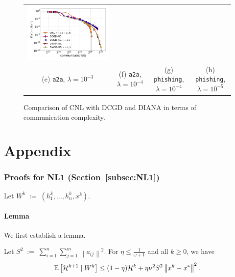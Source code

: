 \documentclass[10pt]{article}
\newcommand{\eqdef}{\; { := }\;}
\newcommand{\ExpBr}[1]{\mathbb{E}\left[#1\right]}
\newcommand{\norm}[1]{\left\|#1\right\|}
\begin{document}
\begin{figure}[ht]
\begin{center}
{\begin{tabular}{cccc}
				\includegraphics[width = 0.23 \textwidth]{LogReg/phishing/Lambda=1e-5/phishing_cnl_diana_dcgd_lmb=0.00001.pdf}
				\\
				(e) {\tt a2a}, $\lambda=10^{-3}$ &(f) {\tt a2a}, $\lambda=10^{-4}$ & (g) {\tt phishing}, $\lambda=10^{-4}$ &(h) {\tt phishing}, $\lambda=10^{-5}$
		\end{tabular}}
		\caption{Comparison of {\sf CNL} with DCGD and DIANA in terms of communication complexity.}
		\label{exp:dcgd_diana}
	\end{center}
	\vskip -0.2in
\end{figure}

\clearpage














\clearpage

\appendix


\part*{Appendix}



\section{Proofs for {\sf NL1} (Section~\ref{subsec:NL1})}


Let $W^k \eqdef (h_1^k, \dots, h_n^k, x^k)$.


\subsection{Lemma}

We first establish a lemma.

\begin{lemma}\label{lm:calHk} Let $S^2\eqdef \sum_{i=1}^n \sum_{j=1}^m \norm{a_{ij}}^2$. For $\eta \leq \frac{1}{\omega+1}$ and all $k\geq 0$, we have 
$$
\ExpBr{ {\cal H}^{k+1} \;|\; W^k} \leq  (1-\eta) {\cal H}^k +  \eta \nu^2 S^2 \norm{x^k - x^*}^2.
$$
\end{lemma}
\end{document}
